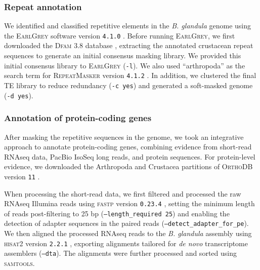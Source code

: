 \documentclass[11pt]{article}
\newcommand{\bgla}{\textit{B. glandula}\xspace}
\begin{document}
\subsubsection*{Repeat annotation}

We identified and classified repetitive elements in the \bgla{} genome
using the \textsc{EarlGrey} software version \texttt{4.1.0} \citep{baril_earl_2024}.
Before running \textsc{EarlGrey}, we first downloaded the \textsc{Dfam 3.8} database
\citep{storer_dfam_2021}, extracting the annotated crustacean repeat sequences to generate
an initial consensus masking library. We provided this initial consensus library to
\textsc{EarlGrey} (\texttt{-l}). We also used ``arthropoda'' as the search term for
\textsc{RepeatMasker} version \texttt{4.1.2} \citep{smit_repeatmasker_2013}. In addition,
we clustered the final TE library to reduce redundancy (\texttt{-c yes}) and generated a
soft-masked genome (\texttt{-d yes}).

\subsubsection*{Annotation of protein-coding genes}\label{sec:methods_protein_coding}

After masking the repetitive sequences in the genome, we took an integrative approach to
annotate protein-coding genes, combining evidence from short-read RNAseq data, PacBio
IsoSeq long reads, and protein sequences. For protein-level evidence, we downloaded the
Arthropoda and Crustacea partitions of \textsc{OrthoDB} version \texttt{11}
\citep{kriventseva_orthodb_2019,zdobnov_orthodb_2021}.
\vspace{0.2cm}

When processing the short-read data, we first filtered and processed the raw RNAseq
Illumina reads using \textsc{fastp} version \texttt{0.23.4} \citep{chen_fastp_2018,
chen_ultrafast_2023}, setting the minimum length of reads post-filtering to 25 bp
(\texttt{--length\_required 25}) and enabling the detection of adapter sequences in the
paired reads (\texttt{--detect\_adapter\_for\_pe}). We then aligned the processed RNAseq
reads to the \bgla{} assembly using \textsc{hisat2} version \texttt{2.2.1}
\citep{kim_graph-based_2019}, exporting alignments tailored for \textit{de novo}
transcriptome assemblers (\texttt{--dta}). The alignments were further processed and
sorted using \textsc{samtools}.
\vspace{0.2cm}
\end{document}
